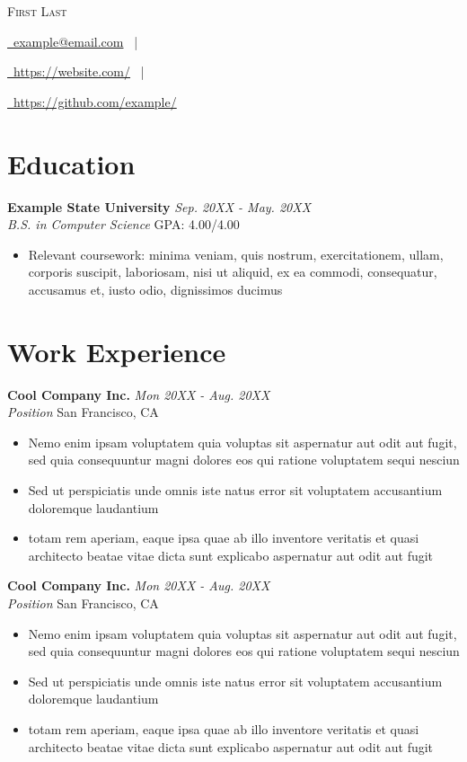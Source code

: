 \documentclass[letterpaper,10pt]{article}
\makeatletter
\newcommand{\organization}[4]{
    \vspace{1.5pt}
    \textbf{#1} \hfill{\emph{#2}} \\
    \emph{#3} \hfill{#4} \\
    \vspace{3pt}
}
\newcommand{\bulletsBegin}{
    \vspace{1pt}
    \begin{minipage}{17.6cm} 
    \begin{itemize}[leftmargin=0.6cm]
    \setlength\itemsep{-0.009em}
}
\newcommand{\bulletsEnd}{
    \end{itemize}\vspace{0pt}
    \end{minipage}
}
\newcommand{\mySite}[1]{
    \href{https://example.com}{\faLink \ #1}
    \ |
}
\newcommand{\myEmail}[1]{
    \href{mailto:example@email.edu}{\faEnvelope \ #1}
    \ |
}
\newcommand{\myGitHub}[1]{
    \href{https://github.com/example/}{\faGithub \ #1}
}
\newcommand{\myName}[4]{
    \begin{center}
        {\huge{\color{burgundy}\scshape{#1}}} \\
        \vspace{8pt}
        \myEmail{#4}
        \mySite{#2}
        \myGitHub{#3}
    \end{center}
    \vspace{-4pt}
}
\makeatother
\begin{document}
    \myName{First Last}{https://website.com/}{https://github.com/example/}{example@email.com}

    \section{Education}
        
    \organization{Example State University}{Sep. 20XX - May. 20XX}
        {B.S. in Computer Science}{GPA: 4.00/4.00}
        \bulletsBegin
            \item Relevant coursework: minima veniam, quis nostrum, exercitationem, ullam, corporis suscipit, laboriosam, nisi ut aliquid, ex ea commodi, consequatur, accusamus et, iusto odio, dignissimos ducimus
        \bulletsEnd
        \vspace{-2pt}

    \section{Work Experience}

        \organization{Cool Company Inc.}{Mon 20XX - Aug. 20XX}
        {Position}{San Francisco, CA}
        \bulletsBegin
            \item Nemo enim ipsam voluptatem quia voluptas sit aspernatur aut odit aut fugit, sed quia consequuntur magni dolores eos qui ratione voluptatem sequi nesciun
            \item Sed ut perspiciatis unde omnis iste natus error sit voluptatem accusantium doloremque laudantium
            \item totam rem aperiam, eaque ipsa quae ab illo inventore veritatis et quasi architecto beatae vitae dicta sunt explicabo aspernatur aut odit aut fugit
        \bulletsEnd

        \organization{Cool Company Inc.}{Mon 20XX - Aug. 20XX}
        {Position}{San Francisco, CA}
        \bulletsBegin
            \item Nemo enim ipsam voluptatem quia voluptas sit aspernatur aut odit aut fugit, sed quia consequuntur magni dolores eos qui ratione voluptatem sequi nesciun
            \item Sed ut perspiciatis unde omnis iste natus error sit voluptatem accusantium doloremque laudantium
            \item totam rem aperiam, eaque ipsa quae ab illo inventore veritatis et quasi architecto beatae vitae dicta sunt explicabo aspernatur aut odit aut fugit
        \bulletsEnd
\end{document}
